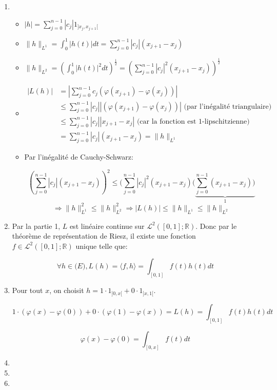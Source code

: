 \documentclass[10pt,a4paper,oneside]{article}
\newenvironment{solution}[1][Solution]{\begin{trivlist}
\item[\hskip \labelsep {\bfseries #1}]}{\end{trivlist}}
\begin{document}
\begin{solution}
\begin{enumerate}
\item
\begin{itemize}
\item
$|h| = \sum_{j = 0}^{n - 1}|c_j| 1_{]x_j,x_{j + 1}[}$

\item
$\| h \|_{L^1} = \int_{0}^1 |h(t)|dt = \sum_{j = 0}^{n - 1} |c_j|(x_{j + 1}-x_j)$

\item
$\| h \|_{L^2} = (\int_{0}^1 |h(t)|^2 dt)^{\frac{1}{2}} = (\sum_{j = 0}^{n - 1} |c_j|^2(x_{j + 1}-x_j))^{\frac{1}{2}}$

\item
\begin{align}
|L(h)| &= |\sum_{j = 0}^{n - 1} c_j (\varphi(x_{j + 1}) - \varphi(x_j))| \nonumber \\
&\leq  \sum_{j = 0}^{n - 1} |c_j| |(\varphi(x_{j + 1}) - \varphi(x_j))| \text{ (par l'inégalité triangulaire)} \nonumber \\
&\leq \sum_{j = 0}^{n - 1} |c_j| |x_{j + 1} - x_{j}| \nonumber \text{ (car la fonction est 1-lipschitzienne)} \nonumber \\
&= \sum_{j = 0}^{n - 1} |c_j| (x_{j + 1} - x_{j}) = \| h \|_{L^1} \nonumber
\end{align}

\item
Par l'inégalité de Cauchy-Schwarz:

\[ (\sum_{j=0}^{n - 1} |c_j|(x_{j + 1} - x_j))^2 \leq (\sum_{j = 0}^{n - 1} |c_j|^2(x_{j + 1} - x_j)(\underbrace{ \sum_{j = 0}^{n - 1}(x_{j + 1}-x_j)) }_{1}\]
\[ \Rightarrow \| h \|_{L^1}^2 \leq \| h \|_{L^2}^2 \Rightarrow |L(h)| \leq \| h \|_{L^1} \leq \| h \|_{L^2} \]
\end{itemize}

\item
Par la partie 1, $L$ est linéaire continue sur $\mathcal{L}^2([0,1];\mathbb{R})$. Donc par le théorème de représentation de Riesz, il existe une fonction $f \in \mathcal{L}^2([0,1];\mathbb{R})$ unique telle que:

\[ \forall h \in \mathcal(E), L(h) = \langle f,h \rangle = \int_{[0,1]} f(t)h(t)dt \]

\item
Pour tout $x$, on choisit $h = 1 \cdot 1_{]0,x[} + 0 \cdot 1_{]x,1[}$.

\[ 1 \cdot (\varphi(x) - \varphi(0)) + 0 \cdot (\varphi(1) - \varphi(x)) = L(h) = \int_{[0,1]} f(t)h(t)dt \]

\[ \varphi(x) - \varphi(0) = \int_{[0,x]} f(t)dt \]

\item

\item

\item

\end{enumerate}
\end{solution}
\end{document}
